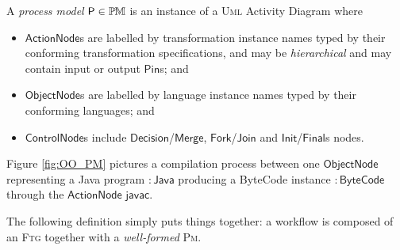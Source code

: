 
\begin{Definition}
A \emph{process model} $\mathsf{P}\in\mathbb{P}\mskip-1mu\mathbb{M}$ is an instance of a \textsc{Uml}
Activity Diagram where
\begin{itemize}
   \item $\mathsf{ActionNode}$s are labelled by transformation instance names 
typed by their conforming transformation specifications, and may be 
\emph{hierarchical} and may contain input or output $\mathsf{Pin}$s; and 
   \item $\mathsf{ObjectNode}$s are labelled by language instance names typed 
by their conforming languages; and 
   \item $\mathsf{ControlNode}$s include 
$\mathsf{Decision}$/$\mathsf{Merge}$, $\mathsf{Fork}$/$\mathsf{Join}$ and 
$\mathsf{Init}$/$\mathsf{Final}$s nodes.   
\end{itemize}
\end{Definition}
Figure \ref{fig:OO_PM} pictures a compilation process between one 
$\mathsf{ObjectNode}$ representing a Java program $\mathsf{:Java}$ producing a 
ByteCode instance $\mathsf{:ByteCode}$ through the  $\mathsf{ActionNode}$ 
$\mathsf{javac}$.

\medskip
The following definition simply puts things together: a workflow is composed of 
an \textsc{Ftg} together with a \emph{well-formed} \textsc{Pm}. 



